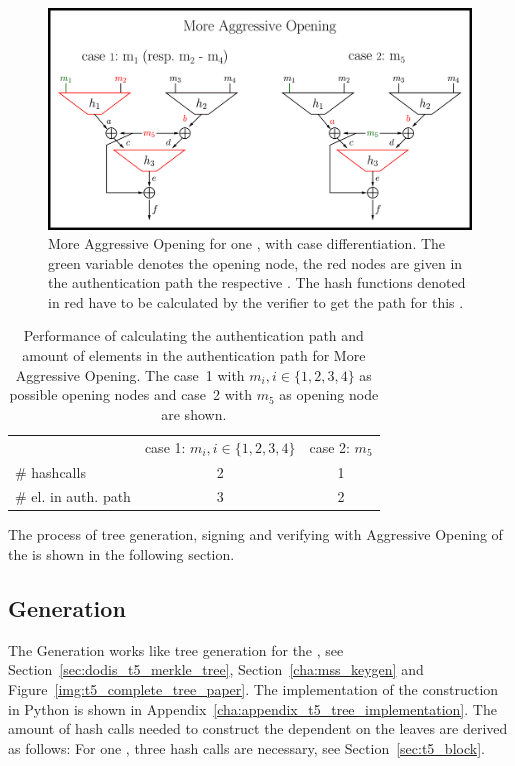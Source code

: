 \begin{figure}
\centering
\includegraphics[]{images/Methods/more_aggr_opening.png}
\caption{More Aggressive Opening for one \tfblock, with case differentiation. The green variable denotes the opening node, the red nodes are given in the authentication path the respective \tfblock. The hash functions denoted in red have to be calculated by the verifier to get the path for this \tfblock.}
\label{img:t5_more_aggr_opening}
\end{figure}

\begin{table}
\centering
\begin{tabular}{l c c} 
 \hline\noalign{\smallskip}
 \multicolumn{3}{c}{\textbf{More Aggressive Opening}} \\
 \hline\noalign{\smallskip}
 & case 1: $m_i, i \in \{1,2,3,4\}$ & case 2: $m_5$ \\
 \# hashcalls & 2 & 1 \\
 \# el. in auth. path & 3 & 2 \\
 \hline
\end{tabular}
\caption{Performance of calculating the authentication path and amount of elements in the authentication path for More Aggressive Opening. The case~1 with $m_i, i \in \{1,2,3,4\}$ as possible opening nodes and case~2 with $m_5$ as opening node are shown.}
\label{table:more_aggr_opening}
\end{table}
The process of tree generation, signing and verifying with Aggressive Opening  of the \extree is shown in the following section. 

\subsection{\texorpdfstring{\extree}{Ext. T5-Tree} Generation}
The \extree Generation works like tree generation for the \tftree, see Section~\ref{sec:dodis_t5_merkle_tree}, Section~\ref{cha:mss_keygen} and Figure~\ref{img:t5_complete_tree_paper}. The implementation of the \extree construction in Python is shown in Appendix~\ref{cha:appendix_t5_tree_implementation}.
% 
The amount of hash calls needed to construct the \extree dependent on the leaves are derived as follows: For one \tfblock, three hash calls are necessary, see Section~\ref{sec:t5_block}. 

